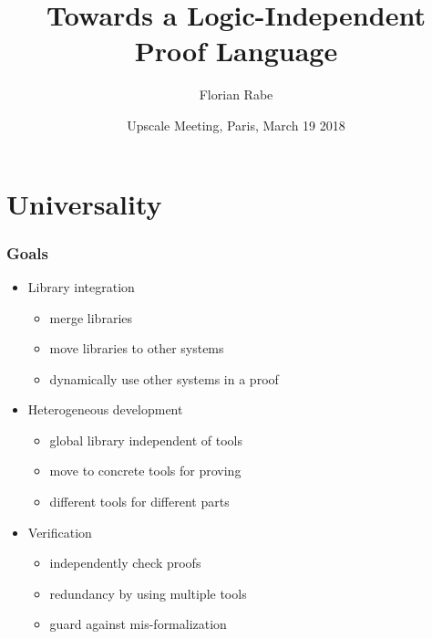 \documentclass{beamer}
\begin{document}
\title{Towards a Logic-Independent Proof Language}
\author{Florian Rabe}
\date{Upscale Meeting, Paris, March 19 2018}
\begin{frame}
    \titlepage
\end{frame}

\section{Universality}

\begin{frame}\frametitle{Goals}
\begin{itemize}
\item Library integration
 \begin{itemize}
 \item merge libraries
 \item move libraries to other systems
 \item dynamically use other systems in a proof
 \end{itemize}
\item Heterogeneous development
 \begin{itemize}
 \item global library independent of tools
 \item move to concrete tools for proving
 \item different tools for different parts
 \end{itemize}
\item Verification
 \begin{itemize}
 \item independently check proofs
 \item redundancy by using multiple tools
 \item guard against mis-formalization
 \end{itemize}
\end{itemize}
\end{frame}
\end{document}
